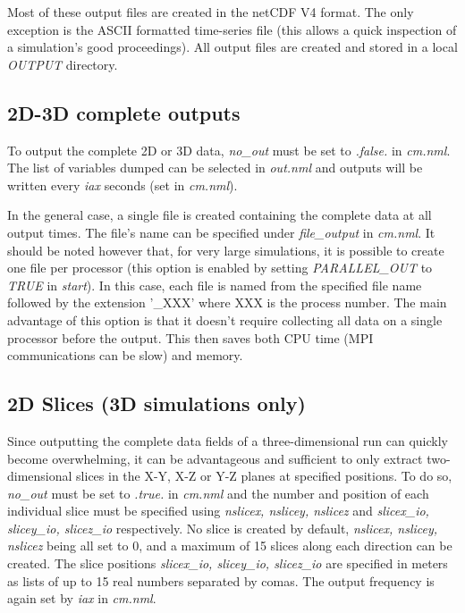 \documentclass[12pt,A4,french]{article}
\begin{document}
Most of these output files are created in the netCDF V4 format. The only exception is the ASCII formatted time-series file (this allows a quick inspection of a simulation's good proceedings). All output files are created and stored in a local {\it OUTPUT} directory.

\subsection{2D-3D complete outputs}

To output the complete 2D or 3D data, {\it no\_out} must be set to {\it .false.} in {\it cm.nml}. The list of variables dumped can be selected in {\it out.nml} and outputs will be written every {\it iax} seconds (set in {\it cm.nml}). 

In the general case, a single file is created containing the complete data at all output times. The file's name can be specified under {\it file\_output} in {\it cm.nml}. It should be noted however that, for very large simulations, it is possible to create one file per processor (this option is enabled by setting {\it PARALLEL\_OUT} to {\it TRUE} in {\it start}). In this case, each file is named from the specified file name followed by the extension '\_XXX' where XXX is the process number. The main advantage of this option is that it doesn't require collecting all data on a single processor before the output. This then saves both CPU time (MPI communications can be slow) and memory.

\subsection{2D Slices (3D simulations only)}

Since outputting the complete data fields of a three-dimensional run can quickly become overwhelming, it can be advantageous and sufficient to only extract two-dimensional slices in the X-Y, X-Z or Y-Z planes at specified positions. To do so, {\it no\_out} must be set to {\it .true.} in {\it cm.nml} and the number and position of each individual slice must be specified using {\it nslicex, nslicey, nslicez} and {\it slicex\_io, slicey\_io, slicez\_io} respectively. No slice is created by default, {\it nslicex, nslicey, nslicez} being all set to 0, and a maximum of 15 slices along each direction can be created. The slice positions {\it slicex\_io, slicey\_io, slicez\_io} are specified in meters as lists of up to 15 real numbers separated by comas. The output frequency is again set by {\it iax} in {\it cm.nml}.
\end{document}
